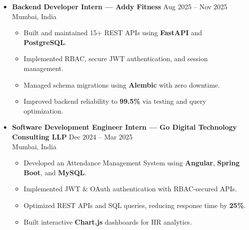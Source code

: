 \documentclass[a4paper,11pt]{article}
\begin{document}
\begin{itemize}
\item \textbf{Backend Developer Intern --- Addy Fitness} \hfill Aug 2025 -- Nov 2025 \\
Mumbai, India
\begin{itemize}
    \item Built and maintained 15+ REST APIs using \textbf{FastAPI} and \textbf{PostgreSQL}.
    \item Implemented RBAC, secure JWT authentication, and session management.
    \item Managed schema migrations using \textbf{Alembic} with zero downtime.
    \item Improved backend reliability to \textbf{99.5\%} via testing and query optimization.
\end{itemize}

\item \textbf{Software Development Engineer Intern --- Go Digital Technology Consulting LLP} \hfill Dec 2024 -- Mar 2025 \\
Mumbai, India
\begin{itemize}
    \item Developed an Attendance Management System using \textbf{Angular}, \textbf{Spring Boot}, and \textbf{MySQL}.
    \item Implemented JWT \& OAuth authentication with RBAC-secured APIs.
    \item Optimized REST APIs and SQL queries, reducing response time by \textbf{25\%}.
    \item Built interactive \textbf{Chart.js} dashboards for HR analytics.
\end{itemize}

\end{itemize}

\end{document}
